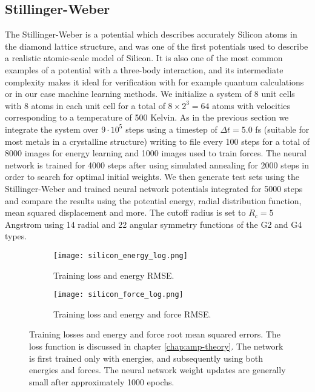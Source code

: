 \subsection{Stillinger-Weber}\label{chap:sw}
The Stillinger-Weber is a potential which describes accurately
Silicon atoms in the diamond lattice structure, and was
one of the first potentials used to describe a realistic atomic-scale
model of Silicon. It is also one of the most common examples
of a potential with a three-body interaction, and its intermediate complexity
makes it ideal for verification with for example quantum calculations
or in our case machine learning methods.
We initialize a system of 8 unit cells with 8 atoms in each unit cell
for a total of $8 \times 2^3 = 64$ atoms with velocities corresponding
to a temperature of 500 Kelvin.
As in the previous section we integrate the system over $9 \cdot 10^5$
steps using a timestep of $\Delta t = 5.0$ fs (suitable for most metals
in a crystalline structure) writing to file every 100 steps
for a total of 8000 images for energy learning
and 1000 images used to train forces.
The neural network is trained for 4000 steps after using simulated annealing
for 2000 steps in order to search for optimal initial weights.
We then generate test sets using the Stillinger-Weber and trained neural network
potentials integrated for 5000 steps and compare the results 
using the potential energy, radial distribution function, 
mean squared displacement and more.
The cutoff radius is set to $R_c = 5$ Angstrom using 14 radial and
22 angular symmetry functions of the G2 and G4 types.

\begin{figure}[H]
\begin{adjustbox}{max width=1.2\linewidth,center}
\centering
  \begin{subfigure}[b]{0.55\textwidth}
      \texttt{[image: silicon\_energy\_log.png]}
    \caption{Training loss and energy RMSE.}
  \end{subfigure}
  \hfill
  \begin{subfigure}[b]{0.55\textwidth}
      \texttt{[image: silicon\_force\_log.png]}
    \caption{Training loss and energy and force RMSE.}
  \end{subfigure}
\end{adjustbox}
\caption{Training losses and energy and force root mean squared errors.
    The loss function is discussed in chapter \ref{chap:amp-theory}.
    The network is first trained only with energies, and subsequently
    using both energies and forces.
    The neural network weight updates are generally small after approximately
    1000 epochs.}
    \label{fig:silicon-log}
\end{figure}

